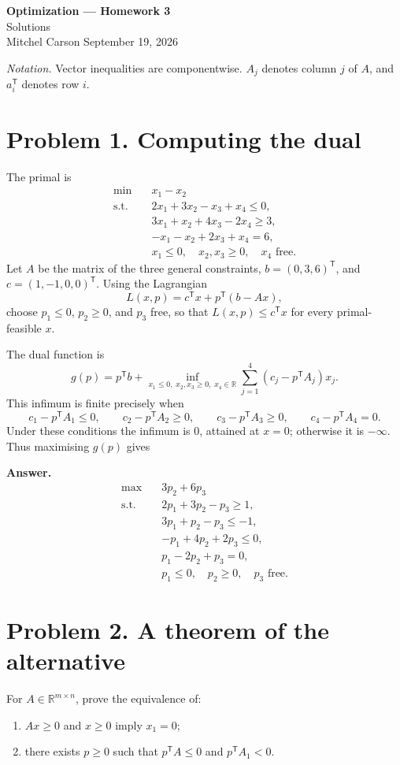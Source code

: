 \documentclass[11pt]{article}
\newcommand{\R}{\mathbb{R}}
\newcommand{\T}{^{\mathsf T}}
\newcommand{\answer}[1]{\begin{shaded}\noindent\textbf{Answer.} #1\end{shaded}}
\begin{document}
\begin{center}
{\Large\bfseries Optimization --- Homework 3}\\[4pt]
{\large Solutions}\\[6pt]
Mitchel Carson \hfill September 19, 2026
\end{center}
\medskip

\textit{Notation.} Vector inequalities are componentwise. $A_j$ denotes column $j$ of $A$, and $a_i\T$ denotes row $i$.

\section*{Problem 1. Computing the dual}
The primal is
\[
\begin{aligned}
\min\quad &x_1-x_2\\
\text{s.t.}\quad &2x_1+3x_2-x_3+x_4\le0,\\
&3x_1+x_2+4x_3-2x_4\ge3,\\
&-x_1-x_2+2x_3+x_4=6,\\
&x_1\le0,\quad x_2,x_3\ge0,\quad x_4\text{ free}.
\end{aligned}
\]
Let $A$ be the matrix of the three general constraints, $b=(0,3,6)\T$, and $c=(1,-1,0,0)\T$. Using the Lagrangian
\[
L(x,p)=c\T x+p\T(b-Ax),
\]
choose $p_1\le0$, $p_2\ge0$, and $p_3$ free, so that $L(x,p)\le c\T x$ for every primal-feasible $x$.

The dual function is
\[
g(p)=p\T b+
\inf_{x_1\le0,\;x_2,x_3\ge0,\;x_4\in\R}
\sum_{j=1}^4(c_j-p\T A_j)x_j.
\]
This infimum is finite precisely when
\[
c_1-p\T A_1\le0,\qquad
c_2-p\T A_2\ge0,\qquad
c_3-p\T A_3\ge0,\qquad
c_4-p\T A_4=0.
\]
Under these conditions the infimum is $0$, attained at $x=0$; otherwise it is $-\infty$. Thus maximising $g(p)$ gives
\answer{
\[
\begin{aligned}
\max\quad &3p_2+6p_3\\
\text{s.t.}\quad &2p_1+3p_2-p_3\ge1,\\
&3p_1+p_2-p_3\le-1,\\
&-p_1+4p_2+2p_3\le0,\\
&p_1-2p_2+p_3=0,\\
&p_1\le0,\quad p_2\ge0,\quad p_3\text{ free}.
\end{aligned}
\]
}

\newpage
\section*{Problem 2. A theorem of the alternative}
For $A\in\R^{m\times n}$, prove the equivalence of:
\begin{enumerate}
\item[(i)] $Ax\ge0$ and $x\ge0$ imply $x_1=0$;
\item[(ii)] there exists $p\ge0$ such that $p\T A\le0$ and $p\T A_1<0$.
\end{enumerate}
\end{document}
